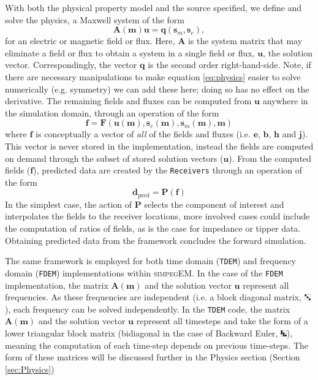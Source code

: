\documentclass[preprint,review,3p,times,onecolumn,authoryear]{elsarticle}
\newcommand{\simpegEM}{\textsc{simpegEM}\xspace}
\newcommand{\Receivers}{\texttt{Receivers}\xspace}
\newcommand{\TDEM}{\texttt{TDEM}\xspace}
\newcommand{\FDEM}{\texttt{FDEM}\xspace}
\newcommand{\dpred}{\mathbf{d}_\text{pred}}
\newcommand{\sm}{\mathbf{s}_m}
\newcommand{\se}{\mathbf{s}_e}
\begin{document}
With both the physical property model and the source specified, we define and
solve the physics, a Maxwell system of the form
\begin{equation}
\mathbf{A}(\mathbf{m})\mathbf{u} = \mathbf{q}(\sm,\se),
    \label{eq:physics}
\end{equation}
for an electric or magnetic field or flux. Here, $\mathbf{A}$ is the system
matrix that may eliminate a field or flux to obtain a system in a single field
or flux, $\mathbf{u}$, the solution vector.  Correspondingly, the vector
$\mathbf{q}$ is the second order right-hand-side. Note, if there are necessary
manipulations to make equation \ref{eq:physics} easier to solve numerically
(e.g. symmetry) we can add these here; doing so has no effect on the
derivative. The remaining fields and fluxes can be computed from $\mathbf{u}$
anywhere in the simulation domain, through an operation of the form
\begin{equation}
    \mathbf{f} = \mathbf{F}(\mathbf{u(m)}, \mathbf{s}_e(\mathbf{m}), \mathbf{s}_m(\mathbf{m}), \mathbf{m})
\label{eq:fields}
\end{equation}
where $\mathbf{f}$ is conceptually a vector of \emph{all} of the fields and
fluxes (i.e. $\mathbf{e}$, $\mathbf{b}$, $\mathbf{h}$ and $\mathbf{j}$). This
vector is never stored in the implementation, instead the fields are computed
on demand through the subset of stored solution vectors ($\mathbf{u}$). From the
computed fields ($\mathbf{f}$), predicted data are created by the \Receivers
through an operation of the form
\begin{equation}
    \dpred = \mathbf{P}(\mathbf{f})
\label{eq:data}
\end{equation}
In the simplest case, the action of $\mathbf{P}$ selects the component of interest
and interpolates the fields to the receiver locations, more involved cases
could include the computation of ratios of fields, as is the case for
impedance or tipper data. Obtaining predicted data from the framework
concludes the forward simulation.

The same framework is employed for both time domain (\TDEM) and frequency
domain (\FDEM) implementations within \simpegEM. In the case of the \FDEM
implementation, the matrix $\mathbf{A}(\mathbf{m})$ and the solution vector
$\mathbf{u}$ represent all frequencies. As these frequencies are independent
(i.e. a block diagonal matrix,
\includegraphics[width=0.02\textwidth]{images/blkdiag}),  each frequency can
be solved independently. In the \TDEM code, the matrix
$\mathbf{A}(\mathbf{m})$ and the solution vector $\mathbf{u}$ represent all
timesteps \citep{Oldenburg2013, Haber2014a} and take the form of a  lower
triangular block matrix (bidiagonal in the case of Backward Euler,
\includegraphics[width=0.02\textwidth]{images/blksubdiag}),  meaning the
computation of each time-step depends on previous time-steps. The form of
these matrices will be discussed further in the Physics section (Section \ref{sec:Physics})
\end{document}

